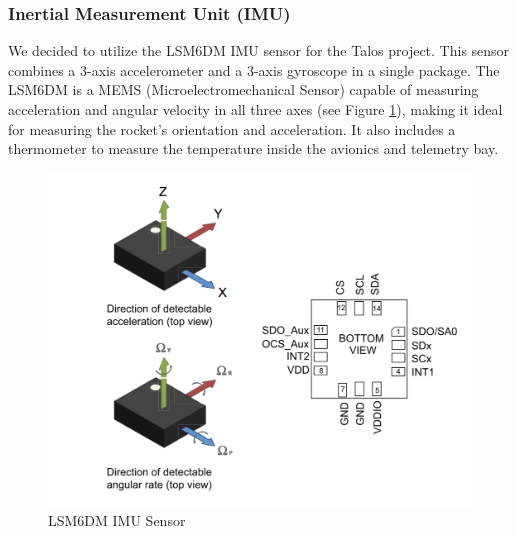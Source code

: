 \documentclass{article}
\begin{document}
\subsubsection*{Inertial Measurement Unit (IMU)}
\qquad We decided to utilize the LSM6DM IMU sensor for the Talos project. This sensor combines a 3-axis accelerometer and a 3-axis gyroscope in a single package. The LSM6DM is a MEMS (Microelectromechanical Sensor) capable of measuring acceleration and angular velocity in all three axes (see Figure \ref{fig:lsm6dm}), making it ideal for measuring the rocket's orientation and acceleration. It also includes a thermometer to measure the temperature inside the avionics and telemetry bay.
\begin{figure}[p]
      \caption{LSM6DM IMU Sensor\cite{LSM6DSM}}
      \label{fig:lsm6dm}
      \centering
      \includegraphics[width=\textwidth]{ldsm6m.png}
\end{figure}
\end{document}
